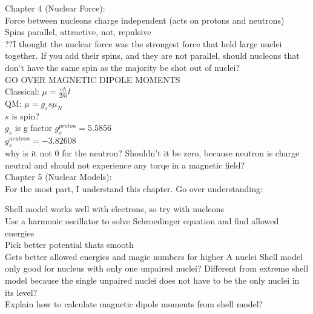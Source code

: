 \documentclass{article}
\begin{document}
\begin{multicols}{3}
Chapter 4 (Nuclear Force):\\
Force between nucleons charge independent (acts on protons and neutrons)\\
Spins parallel, attractive, not, repulsive\\
??I thought the nuclear force was the strongest force that held large nuclei together.  If you add their spins, and they are not parallel, should nucleons that don't have the same spin as the majority be shot out of nuclei?\\
GO OVER MAGNETIC DIPOLE MOMENTS\\
Classical: $\mu = \frac{e \hbar}{2 m} l $\\
QM: $\mu = g_{s}s\mu_{N}$\\
\hspace*{0.01\textwidth} $s$ is spin?\\
\hspace*{0.01\textwidth} $g_{s}$ is g factor
\hspace*{0.01\textwidth} $g_{s}^{proton} = 5.5856$\\
\hspace*{0.01\textwidth} $g_{s}^{neutron} = -3.82608$\\
\hspace*{0.01\textwidth} why is it not 0 for the neutron?  Shouldn't it be zero, because neutron is charge neutral and should not experience any torqe in a magnetic field? \\

Chapter 5 (Nuclear Models):\\

For the most part, I understand this chapter.  Go over understanding:

Shell model works well with electrons, so try with nucleons\\
Use a harmonic oscillator to solve Schroedinger equation and find allowed energies\\
Pick better potential thats smooth\\
\hspace*{0.01\textwidth} Gets better allowed energies and magic 
\hspace*{0.01\textwidth} numbers for higher A nuclei
\hspace*{0.01\textwidth} Shell model only good for nucleus with only one unpaired nuclei?  Different from extreme shell model because the single unpaired nuclei does not have to be the only nuclei in its level?\\
\hspace*{0.01\textwidth} Explain how to calculate magnetic dipole moments from shell model?


\end{multicols}
\end{document}
